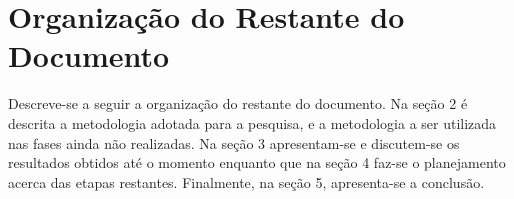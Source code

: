 \section{Organização do Restante do Documento}
\par Descreve-se a seguir a organização do restante do documento. 
Na seção 2 é descrita a metodologia
adotada para a pesquisa, e a metodologia a ser utilizada nas 
fases ainda não realizadas. Na seção 3 apresentam-se e discutem-se os resultados
obtidos até o momento enquanto que na seção 4 faz-se o planejamento acerca das etapas
restantes. Finalmente, na seção 5, apresenta-se a conclusão.
